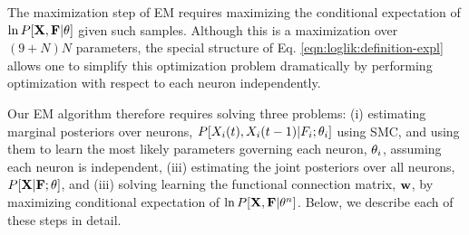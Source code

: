 The maximization step of EM requires maximizing the conditional expectation of $\ln P[{\bf X}, {\bf F} | \mathbf{\theta}]$ given such samples. Although this is a maximization over $(9+N)N$ parameters, the special structure of Eq. \eqref{eqn:loglik:definition-expl} allows one to simplify this optimization problem dramatically by performing optimization with respect to each neuron independently.  

Our EM algorithm therefore requires solving three problems: (i) estimating marginal posteriors over neurons, $P[X_i(t), X_i(t-1) | F_i; \mathbf{\theta}_i]$ using SMC, and using them to learn the most likely parameters governing each neuron, $\mathbf{\theta}_i$, assuming each neuron is independent,  (iii) estimating the joint posteriors over all neurons,  $P[{\bf X}| {\bf F}; \mathbf{\theta}]$, and (iii) solving learning the functional connection matrix, $\mathbf{w}$, by maximizing conditional expectation of  $\ln P[{\bf X}, {\bf F}| \mathbf{\theta}^n]$.  Below, we describe each of these steps in detail. 